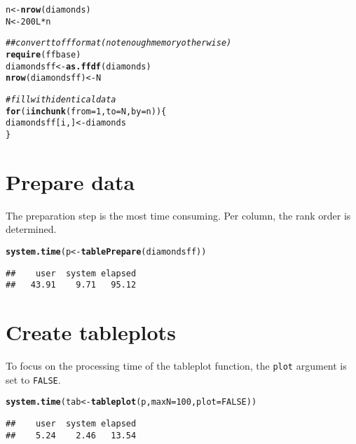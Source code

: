 \documentclass[11pt, fleqn, a4paper]{article}\usepackage[]{graphicx}\usepackage[]{color}
\makeatletter
\newcommand{\hlnum}[1]{\textcolor[rgb]{0.686,0.059,0.569}{#1}}%
\newcommand{\hlcom}[1]{\textcolor[rgb]{0.678,0.584,0.686}{\textit{#1}}}%
\newcommand{\hlopt}[1]{\textcolor[rgb]{0,0,0}{#1}}%
\newcommand{\hlstd}[1]{\textcolor[rgb]{0.345,0.345,0.345}{#1}}%
\newcommand{\hlkwa}[1]{\textcolor[rgb]{0.161,0.373,0.58}{\textbf{#1}}}%
\newcommand{\hlkwb}[1]{\textcolor[rgb]{0.69,0.353,0.396}{#1}}%
\newcommand{\hlkwc}[1]{\textcolor[rgb]{0.333,0.667,0.333}{#1}}%
\newcommand{\hlkwd}[1]{\textcolor[rgb]{0.737,0.353,0.396}{\textbf{#1}}}%
\newenvironment{kframe}{%
 \def\at@end@of@kframe{}%
 \ifinner\ifhmode%
  \def\at@end@of@kframe{\end{minipage}}%
  \begin{minipage}{\columnwidth}%
 \fi\fi%
 \def\FrameCommand##1{\hskip\@totalleftmargin \hskip-\fboxsep
 \colorbox{shadecolor}{##1}\hskip-\fboxsep
     \hskip-\linewidth \hskip-\@totalleftmargin \hskip\columnwidth}%
 \MakeFramed {\advance\hsize-\width
   \@totalleftmargin\z@ \linewidth\hsize
   \@setminipage}}%
 {\par\unskip\endMakeFramed%
 \at@end@of@kframe}
\newenvironment{knitrout}{}{} %
\makeatother
\begin{document}
\begin{knitrout}
\color{fgcolor}\begin{kframe}
\begin{alltt}
\hlstd{n} \hlkwb{<-} \hlkwd{nrow}\hlstd{(diamonds)}
\hlstd{N} \hlkwb{<-} \hlnum{200L} \hlopt{*} \hlstd{n}

\hlcom{## convert to ff format (not enough memory otherwise)}
\hlkwd{require}\hlstd{(ffbase)}
\hlstd{diamondsff} \hlkwb{<-} \hlkwd{as.ffdf}\hlstd{(diamonds)}
\hlkwd{nrow}\hlstd{(diamondsff)} \hlkwb{<-} \hlstd{N}

\hlcom{# fill with identical data}
\hlkwa{for} \hlstd{(i} \hlkwa{in} \hlkwd{chunk}\hlstd{(}\hlkwc{from} \hlstd{=} \hlnum{1}\hlstd{,} \hlkwc{to} \hlstd{= N,} \hlkwc{by} \hlstd{= n)) \{}
    \hlstd{diamondsff[i, ]} \hlkwb{<-} \hlstd{diamonds}
\hlstd{\}}
\end{alltt}
\end{kframe}
\end{knitrout}


\section{Prepare data}


The preparation step is the most time consuming. Per column, the rank order is determined.
\begin{knitrout}
\color{fgcolor}\begin{kframe}
\begin{alltt}
\hlkwd{system.time}\hlstd{(p} \hlkwb{<-} \hlkwd{tablePrepare}\hlstd{(diamondsff))}
\end{alltt}
\begin{verbatim}
##    user  system elapsed 
##   43.91    9.71   95.12
\end{verbatim}
\end{kframe}
\end{knitrout}


\section{Create tableplots}
To focus on the processing time of the tableplot function, the {\tt plot} argument is set to {\tt FALSE}.  

\begin{knitrout}
\color{fgcolor}\begin{kframe}
\begin{alltt}
\hlkwd{system.time}\hlstd{(tab} \hlkwb{<-} \hlkwd{tableplot}\hlstd{(p,} \hlkwc{maxN} \hlstd{=} \hlnum{100}\hlstd{,} \hlkwc{plot} \hlstd{=} \hlnum{FALSE}\hlstd{))}
\end{alltt}
\begin{verbatim}
##    user  system elapsed 
##    5.24    2.46   13.54
\end{verbatim}
\end{kframe}
\end{knitrout}
\end{document}

